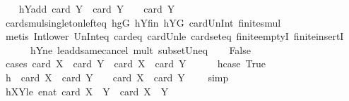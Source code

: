 \begin{isabellebody}
\ \ \isamarkupfalse%
\ hYadd{\isacharcolon}{\kern0pt}\ {\isachardoublequoteopen}card\ {\isacharquery}{\kern0pt}Y{}\ {\isacharplus}{\kern0pt}\ card\ {\isacharquery}{\kern0pt}Y{}\ {\isacharequal}{\kern0pt}\ {}\ {\isacharasterisk}{\kern0pt}\ card\ Y{\isachardoublequoteclose}\isanewline
\ \ \ \ \isamarkupfalse%
\ card{\isacharunderscore}{\kern0pt}smul{\isacharunderscore}{\kern0pt}singleton{\isacharunderscore}{\kern0pt}left{\isacharunderscore}{\kern0pt}eq\ hgG\ hYfin\ hYG\ card{\isacharunderscore}{\kern0pt}Un{\isacharunderscore}{\kern0pt}Int\ finite{\isacharunderscore}{\kern0pt}smul\isanewline
\ \ \ \ \isamarkupfalse%
\ {\isacharparenleft}{\kern0pt}metis\ Int{\isacharunderscore}{\kern0pt}lower{}\ Un{\isacharunderscore}{\kern0pt}Int{\isacharunderscore}{\kern0pt}eq{\isacharparenleft}{\kern0pt}{}{\isacharparenright}{\kern0pt}\ card{\isacharunderscore}{\kern0pt}{}{\isacharunderscore}{\kern0pt}eq\ card{\isacharunderscore}{\kern0pt}Un{\isacharunderscore}{\kern0pt}le\ card{\isacharunderscore}{\kern0pt}seteq\ finite{\isachardot}{\kern0pt}emptyI\ finite{\isachardot}{\kern0pt}insertI\ \ \isanewline
\ \ \ \ \ \ hY{}ne\ le{\isacharunderscore}{\kern0pt}add{\isacharunderscore}{\kern0pt}same{\isacharunderscore}{\kern0pt}cancel{}\ mult{\isacharunderscore}{\kern0pt}{}\ subset{\isacharunderscore}{\kern0pt}Un{\isacharunderscore}{\kern0pt}eq{\isacharparenright}{\kern0pt}\isanewline
\ \ \isamarkupfalse%
\ False\isanewline
\ \ \isamarkupfalse%
\ {\isacharparenleft}{\kern0pt}cases\ {\isachardoublequoteopen}card\ {\isacharquery}{\kern0pt}X{}\ {\isacharplus}{\kern0pt}\ card\ {\isacharquery}{\kern0pt}Y{}\ {\isachargreater}{\kern0pt}\ card\ X\ {\isacharplus}{\kern0pt}\ card\ Y{\isachardoublequoteclose}{\isacharparenright}{\kern0pt}\isanewline
\ \ \ \ \isamarkupfalse%
\ hcase{\isacharcolon}{\kern0pt}\ True\isanewline
\ \ \ \ \isamarkupfalse%
\ \isamarkupfalse%
\ h\ {\isacharcolon}{\kern0pt}\ {\isachardoublequoteopen}card\ X\ {\isacharplus}{\kern0pt}\ card\ Y\ {\isacharminus}{\kern0pt}\ {}\ {\isasymle}\ card\ {\isacharquery}{\kern0pt}X{}\ {\isacharplus}{\kern0pt}\ card\ {\isacharquery}{\kern0pt}Y{}\ {\isacharminus}{\kern0pt}\ {}{\isachardoublequoteclose}\ \isamarkupfalse%
\ simp\isanewline
\ \ \ \ \isamarkupfalse%
\ hXY{}le{\isacharcolon}{\kern0pt}\ {\isachardoublequoteopen}enat\ {\isacharparenleft}{\kern0pt}card\ {\isacharparenleft}{\kern0pt}{\isacharquery}{\kern0pt}X{}\ {\isasymcdots}\ {\isacharquery}{\kern0pt}Y{}{\isacharparenright}{\kern0pt}{\isacharparenright}{\kern0pt}\ {\isasymle}\ card\ {\isacharparenleft}{\kern0pt}X\ {\isasymcdots}\ Y{\isacharparenright}{\kern0pt}{\isachardoublequoteclose}\ \isanewline

\end{isabellebody}
